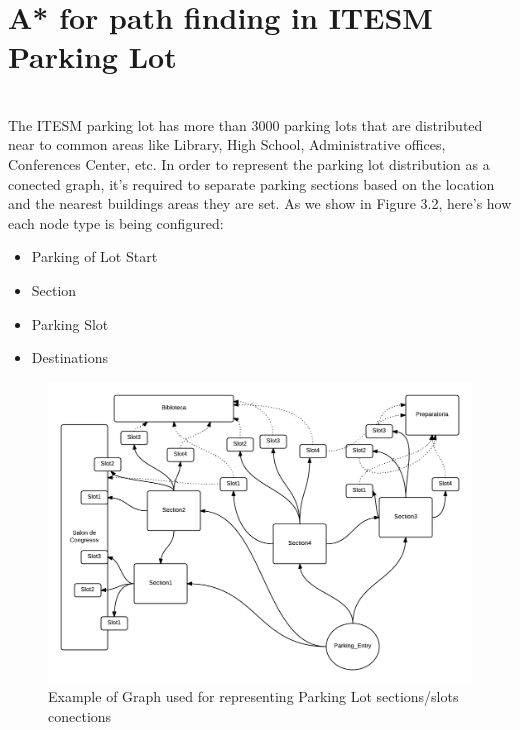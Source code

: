 \section{A* for path finding in ITESM Parking Lot}
\paragraph{} ~\\
The ITESM parking lot has more than 3000 parking lots that are distributed near to common areas like Library, High School, Administrative offices, Conferences Center, etc.
In order to represent the parking lot distribution as a conected graph, it's required to separate parking sections based on the location and the nearest buildings areas 
they are set.
As we show in Figure 3.2, here's how each node type is being configured:
\begin{itemize}
\item{Parking of Lot Start}
\item{Section}
\item{Parking Slot}
\item{Destinations}
\end{itemize}

\begin{figure}[H]
    \centering
    \includegraphics[width=1\textwidth]{images/parking_lot_diagram.png}
    \caption{Example of Graph used for representing Parking Lot sections/slots conections}
    \label{fig:parking_lot_diagram}
\end{figure}

